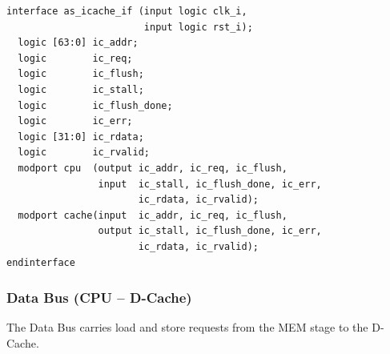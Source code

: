 \begin{verbatim}
interface as_icache_if (input logic clk_i,
                        input logic rst_i);
  logic [63:0] ic_addr;
  logic        ic_req;
  logic        ic_flush;
  logic        ic_stall;
  logic        ic_flush_done;
  logic        ic_err;
  logic [31:0] ic_rdata;
  logic        ic_rvalid;
  modport cpu  (output ic_addr, ic_req, ic_flush,
                input  ic_stall, ic_flush_done, ic_err, 
                       ic_rdata, ic_rvalid);
  modport cache(input  ic_addr, ic_req, ic_flush,
                output ic_stall, ic_flush_done, ic_err, 
                       ic_rdata, ic_rvalid);
endinterface
\end{verbatim}

\subsubsection{Data Bus (CPU -- D-Cache)}
\label{subsec:dBusIf}

The Data Bus carries load and store requests from the MEM stage to the
D-Cache.

